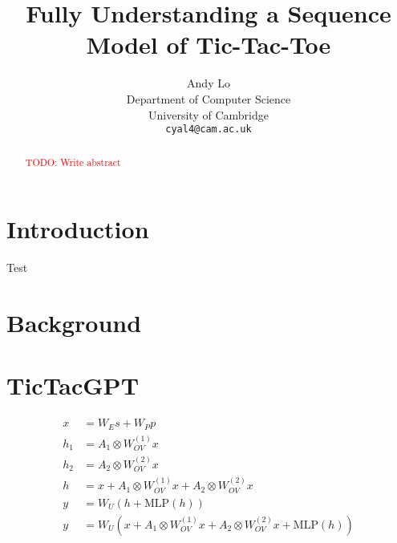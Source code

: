 \documentclass{article}
\title{Fully Understanding a Sequence Model of Tic-Tac-Toe}
\author{%
  Andy Lo \\
  Department of Computer Science\\
  University of Cambridge\\
  \texttt{cyal4@cam.ac.uk} \\
}
\newcommand{\todo}[1]{\textcolor{red}{TODO: #1}}
\newcommand{\ttgpt}{TicTacGPT\xspace}
\renewcommand{\v}[1]{#1}
\newcommand{\m}[1]{#1}
\begin{document}
\maketitle


\begin{abstract}
    \todo{Write abstract}
\end{abstract}


\section{Introduction}

Test \cite{orthello-gpt,linear-orthello-gpt}

\section{Background}

\section{\ttgpt}


\begin{equation}
    \begin{aligned}
        \v{x} & = \m{W}_E \v{s} + \m{W}_P \v{p}       \\
        h_1   & = A_1 \otimes \m{W}^{(1)}_{OV} \v{x}  \\
        h_2   & = A_2 \otimes \m{W}^{(2)}_{OV} \v{x}  \\
        \v{h} & = \v{x}
        + A_1 \otimes \m{W}^{(1)}_{OV} \v{x}
        + A_2 \otimes \m{W}^{(2)}_{OV} \v{x}          \\
        \v{y} & = \m{W}_U (\v{h} + \text{MLP}(\v{h})) \\
        \v{y} & = \m{W}_U (
        \v{x}
        + A_1 \otimes \m{W}^{(1)}_{OV} \v{x}
        + A_2 \otimes \m{W}^{(2)}_{OV} \v{x}
        + \text{MLP}(\v{h})
        )
    \end{aligned}
\end{equation}


\end{document}
